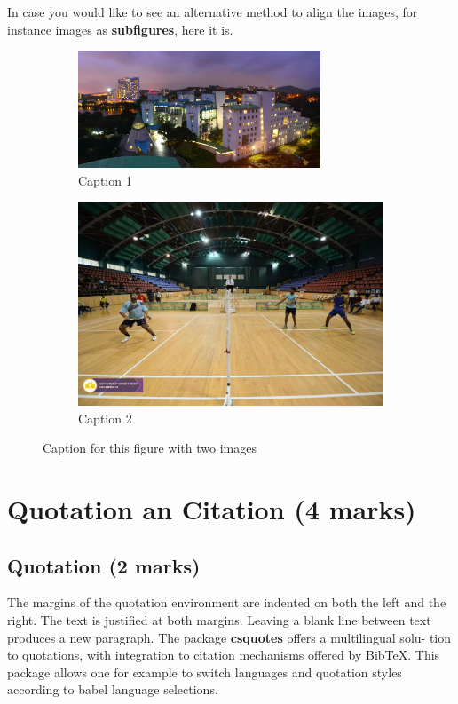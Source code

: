 \documentclass[a4paper, 11pt]{article}
\begin{document}
In case you would like to see an alternative method to align the images, for instance images as \textbf{subfigures}, here it is.

\begin{figure}[H]
\begin{subfigure}{.5\textwidth}
  \centering
  \includegraphics[width=.85\linewidth, height=3.5cm]{3.jpg}
  \caption{Caption 1}
  \label{fig:sub1}
\end{subfigure}%
\begin{subfigure}{.5\textwidth}
  \centering
  \includegraphics[width=.85\linewidth]{4.jpg}
  \caption{Caption 2}
  \label{fig:sub2}
\end{subfigure}
\caption{Caption for this figure with two images}
\label{fig:test}
\end{figure}

\newpage
\section{Quotation an Citation (4 marks)}

\subsection{Quotation (2 marks)}
The margins of the quotation environment are indented on both the left and the
right. The text is justified at both margins. Leaving a blank line between text
produces a new paragraph. The package \textbf{csquotes} offers a multilingual solu-
tion to quotations, with integration to citation mechanisms offered by BibTeX.
This package allows one for example to switch languages and quotation styles
according to babel language selections.
\end{document}

